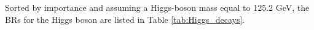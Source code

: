 \indent Sorted by importance and assuming a Higgs-boson mass equal to 125.2 GeV, the BRs for the Higgs boson are listed in Table \ref{tab:Higgs_decays}.





